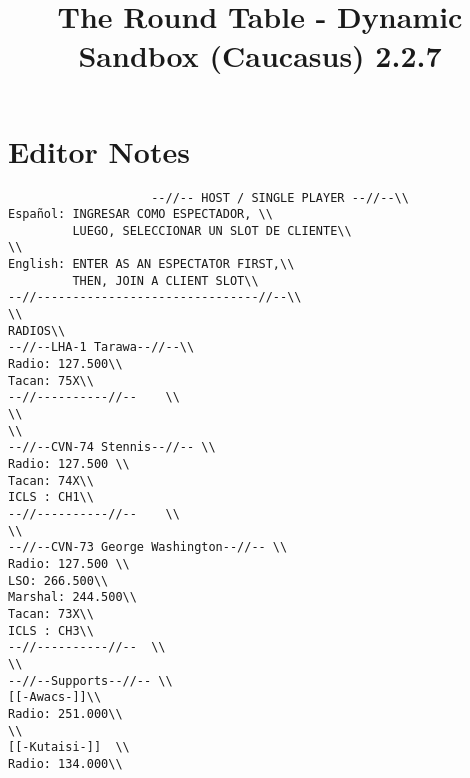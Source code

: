 \documentclass{article}
\title{The Round Table - Dynamic Sandbox (Caucasus) 2.2.7}
\begin{document}
                    \maketitle

                    \section{Editor Notes}
                    \begin{verbatim}
                    --//-- HOST / SINGLE PLAYER --//--\\
Español: INGRESAR COMO ESPECTADOR, \\
         LUEGO, SELECCIONAR UN SLOT DE CLIENTE\\
\\
English: ENTER AS AN ESPECTATOR FIRST,\\
         THEN, JOIN A CLIENT SLOT\\
--//-------------------------------//--\\
\\
RADIOS\\
--//--LHA-1 Tarawa--//--\\
Radio: 127.500\\
Tacan: 75X\\
--//----------//--    \\
\\
\\
--//--CVN-74 Stennis--//-- \\
Radio: 127.500 \\
Tacan: 74X\\
ICLS : CH1\\
--//----------//--    \\
\\
--//--CVN-73 George Washington--//-- \\
Radio: 127.500 \\
LSO: 266.500\\
Marshal: 244.500\\
Tacan: 73X\\
ICLS : CH3\\
--//----------//--  \\
\\
--//--Supports--//-- \\
[[-Awacs-]]\\
Radio: 251.000\\
\\
[[-Kutaisi-]]  \\
Radio: 134.000\\

\end{verbatim}
\end{document}
